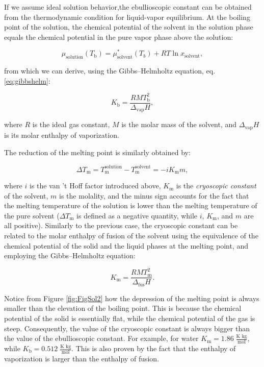 \documentclass[
  9pt,
]{extbook}
\theoremstyle{definition}
\theoremstyle{definition}
\theoremstyle{definition}
\theoremstyle{remark}
\begin{document}
If we assume ideal solution behavior,the ebullioscopic constant can be obtained from the thermodynamic condition for liquid-vapor equilibrium. At the boiling point of the solution, the chemical potential of the solvent in the solution phase equals the chemical potential in the pure vapor phase above the solution:

\begin{equation}
\mu_{\text{solution}} (T_{\text{b}})  = \mu_{\text{solvent}}^*(T_b)  + RT\ln x_{\text{solvent}},
\label{eq:coll4}
\end{equation}

from which we can derive, using the Gibbs--Helmholtz equation, eq. \eqref{eq:gibbshelm}:

\begin{equation}
K_{\text{b}}=\frac{RMT_{\text{b}}^{2}}{\Delta_{\mathrm{vap}} H},
\label{eq:coll5}
\end{equation}

where \(R\) is the ideal gas constant, \(M\) is the molar mass of the solvent, and \(\Delta_{\mathrm{vap}} H\) is its molar enthalpy of vaporization.

The reduction of the melting point is similarly obtained by:

\begin{equation}
\Delta T_{\text{m}}=T_{\text{m}}^{\text{solution}}-T_{\text{m}}^{\text{solvent}}=-iK_{\text{m}}m,
\label{eq:coll6}
\end{equation}

where \(i\) is the van 't Hoff factor introduced above, \(K_{\text{m}}\) is the \emph{cryoscopic constant} of the solvent, \(m\) is the molality, and the minus sign accounts for the fact that the melting temperature of the solution is lower than the melting temperature of the pure solvent (\(\Delta T_{\text{m}}\) is defined as a negative quantity, while \(i\), \(K_{\text{m}}\), and \(m\) are all positive). Similarly to the previous case, the cryoscopic constant can be related to the molar enthalpy of fusion of the solvent using the equivalence of the chemical potential of the solid and the liquid phases at the melting point, and employing the Gibbs--Helmholtz equation:

\begin{equation}
K_{\text{m}}=\frac{RMT_{\text{m}}^{2}}{\Delta_{\mathrm{fus}}H}.
\label{eq:coll7}
\end{equation}

Notice from Figure \ref{fig:FigSol2} how the depression of the melting point is always smaller than the elevation of the boiling point. This is because the chemical potential of the solid is essentially flat, while the chemical potential of the gas is steep. Consequently, the value of the cryoscopic constant is always bigger than the value of the ebullioscopic constant. For example, for water \(K_{\text{m}} = 1.86\; \frac{\text{K kg}}{\text{mol}}\), while \(K_{\text{b}} = 0.512\; \frac{\text{K kg}}{\text{mol}}\). This is also proven by the fact that the enthalpy of vaporization is larger than the enthalpy of fusion.
\end{document}
